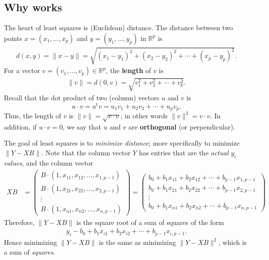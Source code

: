 \documentclass[a4paper, 12pt]{article}
\numberwithin{equation}{section}
\numberwithin{figure}{section}
\theoremstyle{definition}
\newcommand{\R}{\mathbb{R}}
\newcommand{\tr}{\mathrm{t}}
\begin{document}
\subsection{Why  works}

The heart of least squares is (Euclidean) distance. The distance between two points $x = (x_1,\dots, x_p)$ and $y=(y_1,\dots, y_p)$ in $\R^p$ is 
\begin{align*}
	d(x, y) = \| x - y \| = \sqrt{(x_1 - y_1)^2 + (x_2 - y_2)^2 + \cdots + (x_p - y_p)^2}. 
\end{align*}
For a vector $v=(v_1,\dots, v_p)\in\R^p$, the \textbf{length} of $v$ is 
\begin{align*}
	\| v \| = d(0, v) = \sqrt{v_1^2 + v_2^2 + \cdots + v_p^2}.
\end{align*}
Recall that the dot product of two (column) vectors $u$ and $v$ is 
\[ 
	u\cdot v = u^{\tr} v = u_1v_1 + u_2v_2 + \cdots + u_pv_p.
\] 
Thus, the length of $v$ is $\| v \| = \sqrt{v\cdot v}$; in other words $\| v\|^2
= v\cdot v$. In addition, if $u\cdot v = 0$, we say that $u$ and $v$ are
\textbf{orthogonal} (or perpendicular).

The goal of least squares is to \textit{minimize distance}; more specifically to
minimize $\|Y - XB\|$. Note that the column vector $Y$ has entries that are the
\textit{actual $y_i$ values}, and the column vector 
\begin{align*}
	XB &= \begin{pmatrix}
		B\cdot (1, x_{11}, x_{12}, \dots, x_{1,p-1}) \\ 
		B\cdot (1, x_{21}, x_{22}, \dots, x_{2,p-1}) \\ 
		\vdots \\
		B\cdot (1, x_{n1}, x_{n2}, \dots, x_{n,p-1}) 
	\end{pmatrix} = \begin{pmatrix}
		b_0 + b_1x_{11} + b_2x_{12} + \cdots + b_{p-1}x_{1,p-1} \\ 
		b_0 + b_1x_{21} + b_2x_{22} + \cdots + b_{p-1}x_{2,p-1} \\ 
		\vdots \\
		b_0 + b_1x_{n1} + b_2x_{n2} + \cdots + b_{p-1}x_{n,p-1}
	\end{pmatrix}
\end{align*}
Therefore, $\| Y - XB \|$ is the square root of a sum of squares of the form 
\begin{align*}
	y_i - b_0 + b_1x_{i1} + b_2x_{i2} + \cdots + b_{p-1}x_{i,p-1}.
\end{align*}
Hence minimizing $\| Y - XB \|$ is the same as minimizing $\| Y - XB \|^2$,
which is a sum of \textit{squares}.
\end{document}
